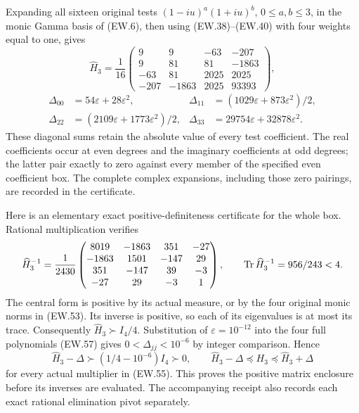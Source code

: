 Expanding all sixteen original tests $(1-iu)^a(1+iu)^b$,
$0\le a,b\le3$, in the monic Gamma basis of (EW.6), then using
(EW.38)--(EW.40) with four weights equal to one, gives
\[
 \widehat H_3=\frac1{16}\begin{pmatrix}
 9&9&-63&-207\\9&81&81&-1863\\
 -63&81&2025&2025\\-207&-1863&2025&93393
 \end{pmatrix},
\]
\[
 \begin{aligned}
 \Delta_{00}&=54\varepsilon+28\varepsilon^2,&
 \Delta_{11}&=(1029\varepsilon+873\varepsilon^2)/2,\\
 \Delta_{22}&=(2109\varepsilon+1773\varepsilon^2)/2,&
 \Delta_{33}&=29754\varepsilon+32878\varepsilon^2.
 \end{aligned}                                                 \tag{EW.57}
\]
These diagonal sums retain the absolute value of every test
coefficient. The real coefficients occur at even degrees and the
imaginary coefficients at odd degrees; the latter pair exactly to
zero against every member of the specified even coefficient box.
The complete complex expansions, including those zero pairings,
are recorded in the certificate.

Here is an elementary exact positive-definiteness certificate for
the whole box. Rational multiplication verifies
\[
 \widehat H_3^{-1}=\frac1{2430}\begin{pmatrix}
 8019&-1863&351&-27\\-1863&1501&-147&29\\
 351&-147&39&-3\\-27&29&-3&1
 \end{pmatrix},\qquad \operatorname{Tr}\widehat H_3^{-1}=956/243<4.
\]
The central form is positive by its actual measure, or by the
four original monic norms in (EW.53). Its inverse is positive,
so each of its eigenvalues is at most its trace. Consequently
$\widehat H_3\succ I_4/4$.
Substitution of $\varepsilon=10^{-12}$ into the four full
polynomials (EW.57) gives $0<\Delta_{jj}<10^{-6}$ by integer
comparison. Hence
\[
 \widehat H_3-\Delta\succ(1/4-10^{-6})I_4\succ0,
 \qquad
 \widehat H_3-\Delta\preceq H_3\preceq\widehat H_3+\Delta
                                                               \tag{EW.58}
\]
for every actual multiplier in (EW.55). This proves the positive
matrix enclosure before its inverses are evaluated. The accompanying
receipt also records each exact rational elimination pivot separately.

